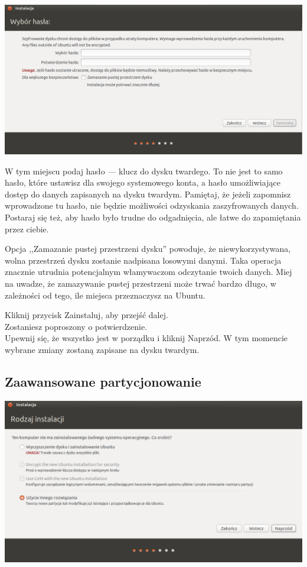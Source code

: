 \begin{center}
	\includegraphics[width=\linewidth]{images/instalator_partycjonowanie_szyfrowanie2.png}
\end{center}

W tym miejscu podaj hasło --- klucz do dysku twardego. To nie jest to samo hasło, które ustawisz dla swojego systemowego konta, a hasło umożliwiające dostęp do danych zapisanych na dysku twardym. Pamiętaj, że jeżeli zapomnisz wprowadzone tu hasło, nie będzie możliwości odzyskania zaszyfrowanych danych. Postaraj się też, aby hasło było trudne do odgadnięcia, ale łatwe do zapamiętania przez ciebie.

Opcja ,,Zamazanie pustej przestrzeni dysku'' powoduje, że niewykorzystywana, wolna przestrzeń dysku zostanie nadpisana losowymi danymi. Taka operacja znacznie utrudnia potencjalnym włamywaczom odczytanie twoich danych. Miej na uwadze, że zamazywanie pustej przestrzeni może trwać bardzo długo, w zależności od tego, ile miejsca przeznaczysz na Ubuntu.
\begin{flushright}
Kliknij przycisk \textcolor{ubuntu_orange}{Zainstaluj}, aby przejść dalej.\\
Zostaniesz poproszony o potwierdzenie.\\
Upewnij się, że wszystko jest w porządku i kliknij \textcolor{ubuntu_orange}{Naprzód}.
W tym momencie wybrane zmiany zostaną zapisane na dysku twardym.\\
\end{flushright}
\clearpage
\subsection{Zaawansowane partycjonowanie}
\begin{center}
	\includegraphics[width=\linewidth]{images/instalator_partycjonowanie_gparted1.png}
\end{center}

